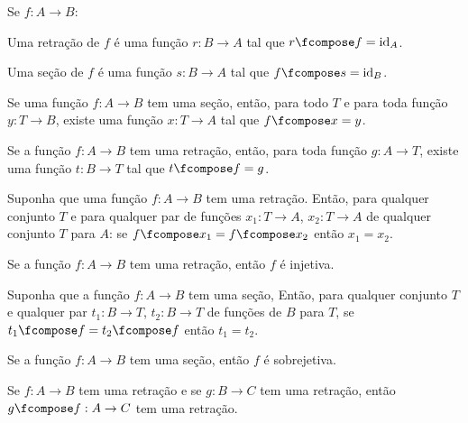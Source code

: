 \begin{definition}
    Se $f : A \to B$:

    Uma retração de $f$ é uma função $r : B \to A$ tal que $r \fcompose f = \text{id}_A$.

    Uma seção de $f$ é uma função $s : B \to A$ tal que $f \fcompose s = \text{id}_B$.
\end{definition}

\begin{exercise}
    Se uma função $f : A \to B$ tem uma seção, então, para todo $T$ e para toda função $y : T \to B$, existe uma função $x : T \to A$ tal que $f \fcompose x = y$.
\end{exercise}

\begin{exercise}
    Se a função $f : A \to B$ tem uma retração, então, para toda função $g : A \to T$, existe uma função $t : B \to T$ tal que $t \fcompose f = g$.
\end{exercise}

\begin{exercise}
    Suponha que uma função $f : A \to B$ tem uma retração. Então, para qualquer conjunto $T$ e para qualquer par de funções $x_1 : T \to A$, $x_2 : T \to A$ de qualquer conjunto $T$ para $A$: se $f \fcompose x_1 = f \fcompose x_2$ então $x_1 = x_2$.
\end{exercise}

\begin{exercise}
    Se a função $f : A \to B$ tem uma retração, então $f$ é injetiva.
\end{exercise}

\begin{homework}
    Suponha que a função $f : A \to B$ tem uma seção, Então, para qualquer conjunto $T$ e qualquer par $t_1 : B \to T$, $t_2 : B \to T$ de funções de $B$ para $T$, se $t_1 \fcompose f = t_2 \fcompose f$ então $t_1 = t_2$.
\end{homework}

\begin{exercise}
    Se a função $f : A \to B$ tem uma seção, então $f$ é sobrejetiva.
\end{exercise}

\begin{exercise}
    Se $f : A \to B$ tem uma retração e se $g : B \to C$ tem uma retração, então $g \fcompose f : A \to C$ tem uma retração.
\end{exercise}

